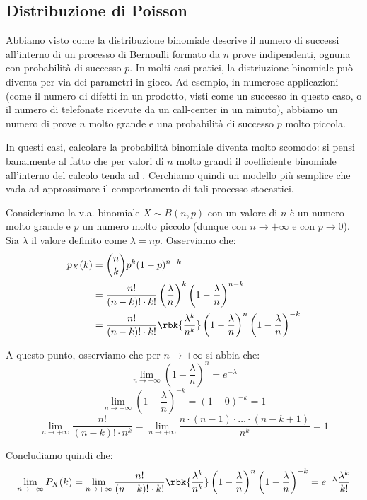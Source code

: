\documentclass[a4paper, 12pt]{report}
\begin{document}
    \subsection{Distribuzione di Poisson}

    Abbiamo visto come la distribuzione binomiale descrive il numero di successi all'interno di un processo di Bernoulli formato da $n$ prove indipendenti, ognuna con probabilità di successo $p$. In molti casi pratici, la distriuzione binomiale può diventa  per via dei parametri in gioco. Ad esempio, in numerose applicazioni (come il numero di difetti in un prodotto, visti come un successo in questo caso, o il numero di telefonate ricevute da un call-center in un minuto), abbiamo un numero di prove $n$ molto grande e una probabilità di successo $p$ molto piccola.
    
    In questi casi, calcolare la probabilità binomiale diventa molto scomodo: si pensi banalmente al fatto che per valori di $n$ molto grandi il coefficiente binomiale all'interno del calcolo tenda ad . Cerchiamo quindi un modello più semplice che vada ad approssimare il comportamento di tali processo stocastici.

    Consideriamo la v.a. binomiale $X \sim B(n,p)$ con un valore di $n$ è un numero molto grande e $p$ un numero molto piccolo (dunque con $n \to +\infty$ e con $p \to 0$). Sia $\lambda$ il valore definito come $\lambda = np$. Osserviamo che:
    \[\begin{split}
        p_X(k) &= \binom{n}{k} p^k (1-p)^{n-k} \\
        &= \frac{n!}{(n-k)! \cdot k!} \left ( \frac{\lambda}{n}\right )^k \left (1- \frac{\lambda}{n}\right )^{n-k} \\
        &= \frac{n!}{(n-k)! \cdot k! } \rbk{\frac{\lambda^k}{n^k}} \left (1- \frac{\lambda}{n}\right )^{n} \left (1- \frac{\lambda}{n}\right )^{-k}
    \end{split} \]

    A questo punto, osserviamo che per $n \to +\infty$ si abbia che:
    \[ \lim_{n \to +\infty} \left (1- \frac{\lambda}{n}\right )^n = e^{-\lambda}\]
    \[\lim_{n \to +\infty} \left (1- \frac{\lambda}{n}\right )^{-k} = (1-0)^{-k} = 1\]
    \[\lim_{n \to +\infty} \frac{n!}{(n-k)! \cdot n^k} = \lim_{n \to +\infty} \frac{n \cdot (n-1) \cdot \ldots \cdot (n-k+1)}{n^k} = 1\]

    Concludiamo quindi che:    
    \[ \lim_{n \to +\infty} P_X(k) = \lim_{n \to +\infty} \frac{n!}{(n-k)! \cdot k! } \rbk{\frac{\lambda^k}{n^k}} \left (1- \frac{\lambda}{n}\right )^{n} \left (1- \frac{\lambda}{n}\right )^{-k} = e^{-\lambda} \frac{\lambda^k}{k!}\]
\end{document}
